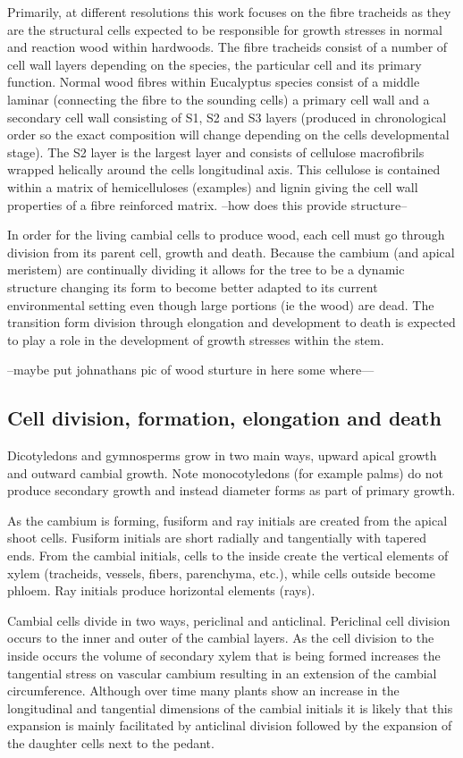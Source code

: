 \documentclass{article}
\begin{document}
Primarily, at different resolutions this work focuses on the fibre tracheids as
they are the structural cells expected to be responsible for growth stresses in
normal and reaction wood within hardwoods. The fibre tracheids consist of a
number of cell wall layers depending on the species, the particular cell and
its primary function. Normal wood fibres within Eucalyptus species
consist of a middle laminar (connecting the fibre to the sounding cells) a
primary cell wall and a secondary cell wall consisting of S1, S2 and S3 layers
(produced in chronological order so the exact composition will change depending
on the cells developmental stage). The S2 layer is the largest layer and
consists of cellulose macrofibrils wrapped helically around the cells
longitudinal axis. This cellulose is contained within a matrix of hemicelluloses (examples)
and lignin giving the cell wall properties of a fibre reinforced matrix. --how
does this provide structure--

In order for the living cambial cells to produce wood, each cell must go
through division from its parent cell, growth and death. Because the
cambium (and apical meristem) are continually dividing it allows for the tree to
be a dynamic structure changing its form to become better adapted to its current environmental
setting even though large portions (ie the wood) are dead. The transition form
division through elongation and development to death is expected to play a role
in the development of growth stresses within the stem.

--maybe put johnathans pic of wood sturture in here some where---

\subsection{Cell division, formation, elongation and death}
Dicotyledons and gymnosperms grow in two main ways, upward apical growth and
outward cambial growth. Note monocotyledons (for example palms) do not produce
secondary growth and instead diameter forms as part of primary growth.

As the cambium is forming, fusiform and ray initials are created from the
apical shoot cells. Fusiform initials are short radially and tangentially with
tapered ends. From the cambial initials, cells to the inside create the vertical
elements of xylem (tracheids, vessels, fibers, parenchyma, etc.), while cells outside become phloem.
Ray initials produce horizontal elements (rays).

Cambial cells divide in two ways, periclinal and anticlinal.
Periclinal cell division occurs to the inner and outer of the cambial layers.
As the cell division to the inside occurs the volume of secondary xylem that is being
formed increases the tangential stress on vascular cambium resulting in an
extension of the cambial circumference. Although over time many plants show an
increase in the longitudinal and tangential dimensions of the cambial initials it is
likely that this expansion is mainly facilitated by anticlinal division followed
by the expansion of the daughter cells next to the pedant.
\end{document}
